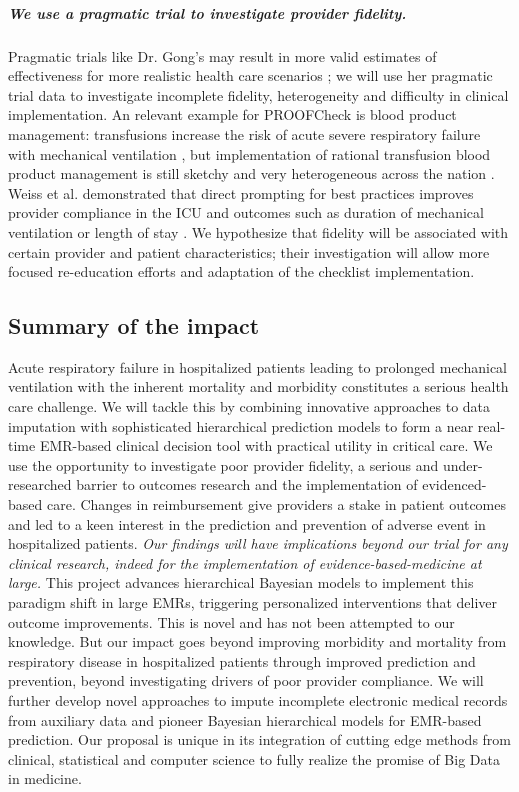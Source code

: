 \documentclass[11pt,notitlepage]{article}
\begin{document}
\subparagraph*{We use a pragmatic trial to investigate provider fidelity.} Pragmatic trials like Dr. Gong's may result in more valid estimates of effectiveness for more realistic health care scenarios \cite{Selby_22824225,Tosh_21842618}; we will use her pragmatic trial data to investigate incomplete fidelity, heterogeneity and difficulty in clinical implementation. An relevant example for PROOFCheck is blood product management: transfusions increase the risk of acute severe respiratory failure with mechanical ventilation \cite{Kenz_24892308}, but implementation of rational transfusion blood product management is still sketchy and very heterogeneous across the nation \cite{Likosky_20488928}. Weiss et al. demonstrated that direct prompting for best practices improves provider compliance in the ICU and outcomes such as duration of mechanical ventilation or length of stay \cite{Weiss_21616996}. We hypothesize that fidelity will be associated with certain provider and patient characteristics; their investigation will allow more focused re-education efforts and adaptation of the checklist implementation. 

\subsection*{Summary of the impact}
Acute respiratory failure in hospitalized patients leading to prolonged mechanical ventilation with the inherent mortality and morbidity constitutes a serious health care challenge. We will tackle this by combining innovative approaches to data imputation with sophisticated hierarchical prediction models to form a near real-time EMR-based clinical decision tool with practical utility in critical care. We use the opportunity to investigate poor provider fidelity, a serious and under-researched barrier to outcomes research and the implementation of evidenced-based care. Changes in reimbursement give providers a stake in patient outcomes and led to a keen interest in the prediction and prevention of adverse event in hospitalized patients. \textit{Our findings will have implications beyond our trial for any clinical research, indeed for the implementation of evidence-based-medicine at large.}  This project advances hierarchical Bayesian models to implement this paradigm shift in large EMRs, triggering personalized interventions that deliver outcome improvements. This is novel and has not been attempted to our knowledge. But our impact goes beyond improving morbidity and mortality from respiratory disease in hospitalized patients through improved prediction and prevention, beyond investigating drivers of poor provider compliance. We will further develop novel approaches to impute incomplete electronic medical records from auxiliary data and pioneer Bayesian hierarchical models for EMR-based prediction. Our proposal is unique in its integration of cutting edge methods from clinical, statistical and computer science to fully realize the promise of Big Data in medicine.
\end{document}
